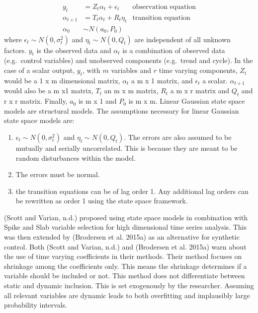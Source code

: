 \documentclass[
]{article}
\begin{document}
\[
\begin{aligned}
y_t&=Z_t\alpha_t+\epsilon_t & \text{observation equation}\\
\alpha_{t+1}&=T_t \alpha_t +R_t \eta_t & \text{transition equation}\\
\alpha_0 &\sim N(a_0, P_0)
\end{aligned}
\] where \(\epsilon_t \sim N(0,\sigma_t^2)\) and
\(\eta_t \sim N(0,Q_t)\) are independent of all unknown factors. \(y_t\)
is the observed data and \(\alpha_t\) is a combination of observed data
(e.g.~control variables) and unobserved components (e.g.~trend and
cycle). In the case of a scalar output, \(y_t\), with \(m\) variables
and \(r\) time varying components, \(Z_t\) would be a 1 x m dimensional
matrix, \(\alpha_t\) a m x 1 matrix, and \(\epsilon_t\) a scalar.
\(\alpha_{t+1}\) would also be a m x1 matrix, \(T_t\) an m x m matrix,
\(R_t\) a m x r matrix and \(Q_t\) and r x r matrix. Finally, \(a_0\) is
m x 1 and \(P_0\) is m x m. Linear Gaussian state space models are
structural models. The assumptions necessary for linear Gaussian state
space models are:

\begin{enumerate}
\def\labelenumi{\arabic{enumi})}
\item
  \(\epsilon_t \sim N(0,\sigma^2_t)\) and \(\eta_{t} \sim N(0, Q_t)\).
  The errors are also assumed to be mutually and serially uncorrelated.
  This is because they are meant to be random disturbances within the
  model.
\item
  The errors must be normal.
\item
  the transition equations can be of lag order 1. Any additional lag
  orders can be rewritten as order 1 using the state space framework.
\end{enumerate}

(Scott and Varian, n.d.) proposed using state space models in
combination with Spike and Slab variable selection for high dimensional
time series analysis. This was then extended by (Brodersen et al. 2015a)
as an alternative for synthetic control. Both (Scott and Varian, n.d.)
and (Brodersen et al. 2015a) warn about the use of time varying
coefficients in their methods. Their method focuses on shrinkage among
the coefficients only. This means the shrinkage determines if a variable
should be included or not. This method does not differentiate between
static and dynamic inclusion. This is set exogenously by the researcher.
Assuming all relevant variables are dynamic leads to both overfitting
and implausibly large probability intervals.
\end{document}
